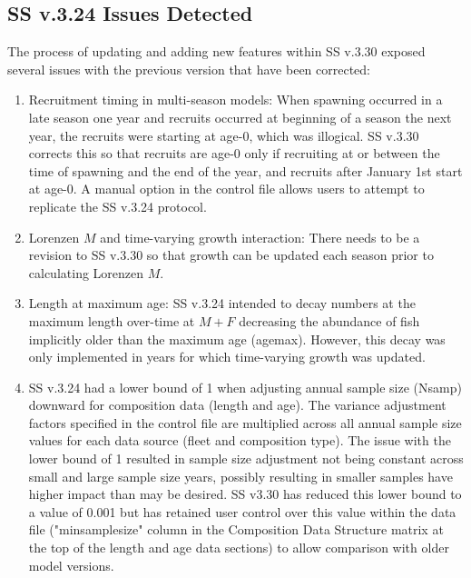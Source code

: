 \subsection{SS v.3.24 Issues Detected}
The process of updating and adding new features within SS v.3.30 exposed several issues with the previous version that have been corrected:
\begin{enumerate}
	\item Recruitment timing in multi-season models: When spawning occurred in a late season one year and recruits occurred at beginning of a season the next year, the recruits were starting at age-0, which was illogical.  SS v.3.30 corrects this so that recruits are age-0 only if recruiting at or between the time of spawning and the end of the year, and recruits after January 1st start at age-0.  A manual option in the control file allows users to attempt to replicate the SS v.3.24 protocol.
	
	\item Lorenzen $M$ and time-varying growth interaction: There needs to be a revision to SS v.3.30 so that growth can be updated each season prior to calculating Lorenzen $M$.
	
	\item Length at maximum age: SS v.3.24 intended to decay numbers at the maximum length over-time at $M + F$ decreasing the abundance of fish implicitly older than the maximum age (agemax).  However, this decay was only implemented in years for which time-varying growth was updated. 
	 
	\item SS v.3.24 had a lower bound of 1 when adjusting annual sample size (Nsamp) downward for composition data (length and age).  The variance adjustment factors specified in the control file are multiplied across all annual sample size values for each data source (fleet and composition type).  The issue with the lower bound of 1 resulted in sample size adjustment not being constant across small and large sample size years, possibly resulting in smaller samples have higher impact than may be desired.  SS v3.30 has reduced this lower bound to a value of 0.001 but has retained user control over this value within the data file ("minsamplesize" column in the Composition Data Structure matrix at the top of the length and age data sections) to allow comparison with older model versions. 
\end{enumerate}